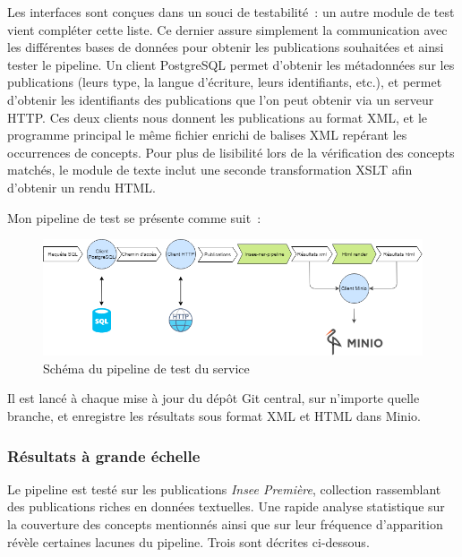 Les interfaces sont conçues dans un souci de testabilité~: un autre module de test vient compléter cette liste. Ce dernier assure simplement la communication avec les différentes bases de données pour obtenir les publications souhaitées et ainsi tester le pipeline. Un client PostgreSQL permet d'obtenir les métadonnées sur les publications (leurs type, la langue d'écriture, leurs identifiants, etc.), et permet d'obtenir les identifiants des publications que l'on peut obtenir via un serveur HTTP. Ces deux clients nous donnent les publications au format XML, et le programme principal le même fichier enrichi de balises XML repérant les occurrences de concepts. Pour plus de lisibilité lors de la vérification des concepts matchés, le module de texte inclut une seconde transformation XSLT afin d'obtenir un rendu HTML.
\newline

Mon pipeline de test se présente comme suit~:
\vspace{10pt}
\begin{figure}[H]
    \centering
    \includegraphics[scale=0.56]{images/Pipeline-test.png}
    \caption{Schéma du pipeline de test du service}
    \label{fig:pipeline-test}
\end{figure}
\vspace{10pt}

Il est lancé à chaque mise à jour du dépôt Git central, sur n'importe quelle branche, et enregistre les résultats sous format XML et HTML dans Minio.
\newline

\subsubsection*{Résultats à grande échelle}
Le pipeline est testé sur les publications \textit{Insee Première}, collection rassemblant des publications riches en données textuelles. Une rapide analyse statistique sur la couverture des concepts mentionnés ainsi que sur leur fréquence d'apparition révèle certaines lacunes du pipeline. Trois sont décrites ci-dessous.
\newline

